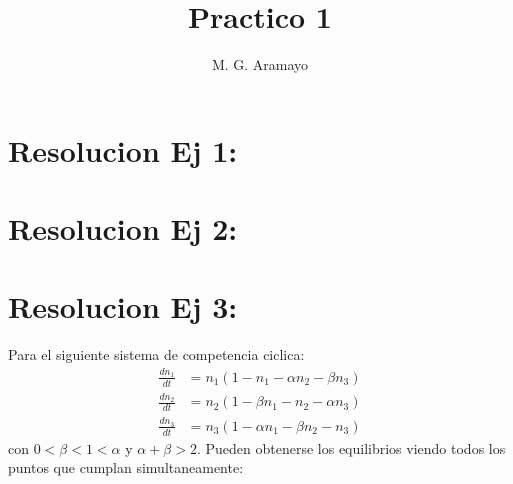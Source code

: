 \documentclass[twocolumn,aps,prl]{revtex4-1}
\begin{document}

\title{Practico 1}
\author{M. G. Aramayo}


\maketitle



\section{Resolucion Ej 1:}


% 

\section{Resolucion Ej 2:}

% 
%                                 
% 

\section{Resolucion Ej 3:}

Para el siguiente sistema de competencia ciclica:
$$
\begin{aligned}
\frac{d n_{1}}{d t}&=n_{1}\left(1-n_{1}-\alpha n_{2}-\beta n_{3}\right) \\
\frac{d n_{2}}{d t}&=n_{2}\left(1-\beta n_{1}-n_{2}-\alpha n_{3}\right) \\
\frac{d n_{3}}{d t}&=n_{3}\left(1-\alpha n_{1}-\beta n_{2}-n_{3}\right)
\end{aligned}
$$
con $0<\beta<1<\alpha$ y $\alpha+\beta>2$. Pueden obtenerse los  equilibrios viendo todos los puntos que cumplan simultaneamente: 
\end{document}
